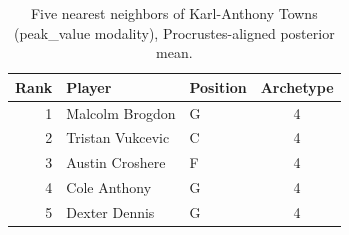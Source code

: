 \begin{table}[htbp]
  \centering\small
  \begin{tabular}{rllc}
    \toprule
    Rank & Player & Position & Archetype \\
    \midrule
    1 & Malcolm Brogdon & G & 4 \\
    2 & Tristan Vukcevic & C & 4 \\
    3 & Austin Croshere & F & 4 \\
    4 & Cole Anthony & G & 4 \\
    5 & Dexter Dennis & G & 4 \\
    \bottomrule
  \end{tabular}
  \caption{Five nearest neighbors of Karl-Anthony Towns (peak_value modality), Procrustes-aligned posterior mean.}
  \label{tab:Karl_Anthony_Towns_neighbors_peak_value}
\end{table}

